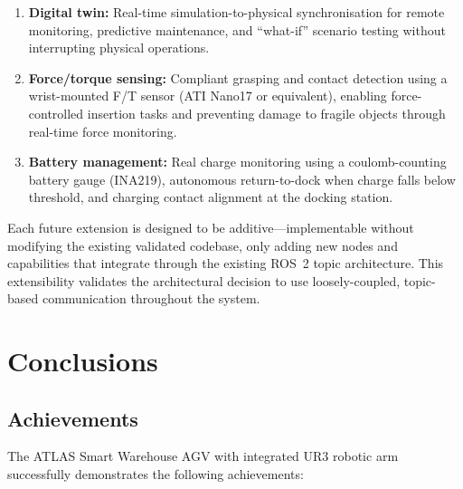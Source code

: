 \documentclass[12pt,a4paper,oneside]{report}
\begin{document}
\begin{enumerate}
\item \textbf{Digital twin:} Real-time simulation-to-physical synchronisation for remote monitoring, predictive maintenance, and ``what-if'' scenario testing without interrupting physical operations.

\item \textbf{Force/torque sensing:} Compliant grasping and contact detection using a wrist-mounted F/T sensor (ATI Nano17 or equivalent), enabling force-controlled insertion tasks and preventing damage to fragile objects through real-time force monitoring.

\item \textbf{Battery management:} Real charge monitoring using a coulomb-counting battery gauge (INA219), autonomous return-to-dock when charge falls below threshold, and charging contact alignment at the docking station.
\end{enumerate}

Each future extension is designed to be additive---implementable without modifying the existing validated codebase, only adding new nodes and capabilities that integrate through the existing ROS~2 topic architecture. This extensibility validates the architectural decision to use loosely-coupled, topic-based communication throughout the system.

\section{Conclusions}

\subsection{Achievements}

The ATLAS Smart Warehouse AGV with integrated UR3 robotic arm successfully demonstrates the following achievements:
\end{document}
